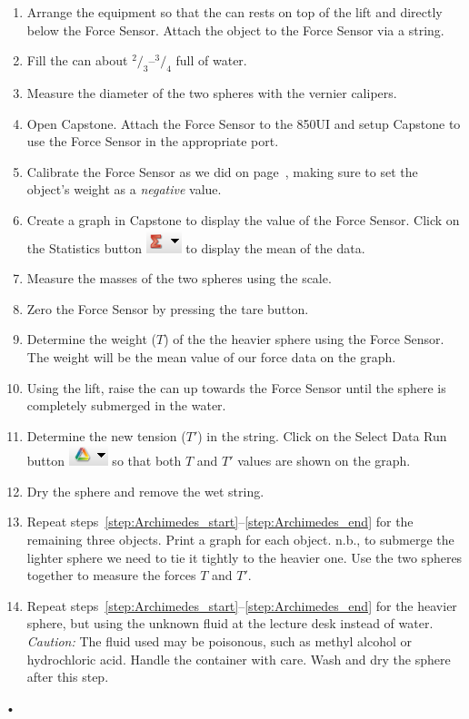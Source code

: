 \documentclass[main.tex]{subfiles}
\begin{document}
\begin{enumerate}
\item
Arrange the equipment so that the can rests on top of the lift and directly below the Force Sensor. Attach the object to the Force Sensor via a string.
\item
Fill the can about $^2\!/_3$--$^3\!/_4$ full of water.
\item
Measure the diameter of the two spheres with the vernier calipers.
\item
Open Capstone. Attach the Force Sensor to the 850UI and setup Capstone to use the Force Sensor in the appropriate port.
\item
Calibrate the Force Sensor as we did on page~\pageref{page:Calibration}, making sure to set the object's weight as a \emph{negative} value.
\item
Create a graph in Capstone to display the value of the Force Sensor. Click on the Statistics button \includegraphics{Statistics} to display the mean of the data.
\item \label{step:Archimedes_start}
Measure the masses of the two spheres using the scale.
\item
Zero the Force Sensor by pressing the tare button.
\item \label{step:T}
Determine the weight ($T$) of the the heavier sphere using the Force Sensor. The weight will be the mean value of our force data on the graph.
\item
Using the lift, raise the can up towards the Force Sensor until the sphere is completely submerged in the water.
\item \label{step:T'}
Determine the new tension ($T'$) in the string. Click on the Select Data Run button \includegraphics{Select_Data_Run} so that both $T$ and $T'$ values are shown on the graph.
\item \label{step:Archimedes_end}
Dry the sphere and remove the wet string.
\item \label{step:repeat}
Repeat steps~\ref{step:Archimedes_start}--\ref{step:Archimedes_end} for the remaining three objects. Print a graph for each object. n.b., to submerge the lighter sphere we need to tie it tightly to the heavier one. Use the two spheres together to measure the forces $T$ and $T'.$
\item \label{step:fluid}
Repeat steps~\ref{step:Archimedes_start}--\ref{step:Archimedes_end} for the heavier sphere, but using the unknown fluid at the lecture desk instead of water. \emph{Caution:} The fluid used may be poisonous, such as methyl alcohol or hydrochloric acid. Handle the container with care. Wash and dry the sphere after this step.
\end{enumerate}•
\end{document}
